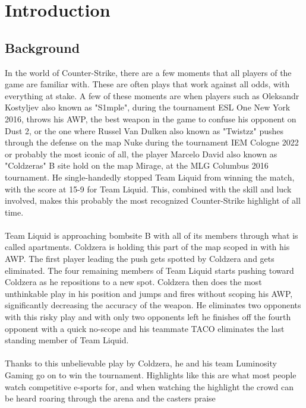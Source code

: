 \chapter{Introduction}
\label{chp:introduction}  %
\section{Background}
In the world of Counter-Strike, there are a few moments that all players of the game are familiar with. These are often plays that work against all odds, with everything at stake. A few of these moments are when players such as Oleksandr Kostyljev also known as "S1mple", during the tournament ESL One New York 2016, throws his \gls{AWP}, the best weapon in the game to confuse his opponent on Dust 2, or the one where Russel Van Dulken also known as "Twistzz" pushes through the defense on the map Nuke during the tournament IEM Cologne 2022 or probably the most iconic of all, the player Marcelo David also known as "Coldzeras" B site hold on the map Mirage, at the MLG Columbus 2016 tournament. He single-handedly stopped Team Liquid from winning the match, with the score at 15-9 for Team Liquid. This, combined with the skill and luck involved, makes this probably the most recognized Counter-Strike highlight of all time.\\\\
Team Liquid is approaching bombsite B with all of its members through what is called apartments. Coldzera is holding this part of the map scoped in with his AWP. The first player leading the push gets spotted by Coldzera and gets eliminated. The four remaining members of Team Liquid starts pushing toward Coldzera as he repositions to a new spot. Coldzera then does the most unthinkable play in his position and jumps and fires without scoping his AWP, significantly decreasing the accuracy of the weapon. He eliminates two opponents with this risky play and with only two opponents left he finishes off the fourth opponent with a quick no-scope and his teammate TACO eliminates the last standing member of Team Liquid.\\\\
Thanks to this unbelievable play by Coldzera, he and his team Luminosity Gaming go on to win the tournament. Highlights like this are what most people watch competitive e-sports for, and when watching the highlight the crowd can be heard roaring through the arena and the casters praise\\\\
